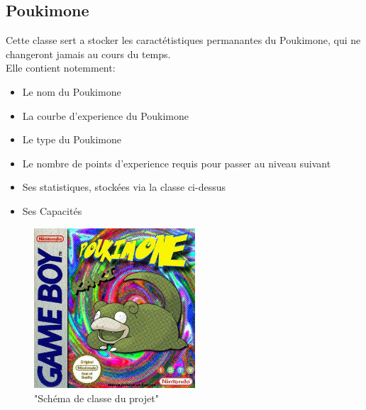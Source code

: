 \documentclass{report}
\begin{document}
\subsection*{Poukimone}
Cette classe sert a stocker les caractétistiques permanantes du Poukimone, qui ne changeront jamais au cours du temps.\\ 
Elle contient notemment:
\begin{itemize}
    \item{Le nom du Poukimone}\\
    \item{La courbe d'experience du Poukimone}\\
    \item{Le type du Poukimone}\\
    \item{Le nombre de points d'experience requis pour passer au niveau suivant}\\
    \item{Ses statistiques, stockées via la classe ci-dessus}\\
    \item{Ses Capacités}
\end{itemize}


\begin{figure}[ht!]
    \centering
    \includegraphics[width=60mm]{cover.jpg}
    \caption{"Schéma de classe du projet"}
\end{figure}
\newpage
\end{document}
